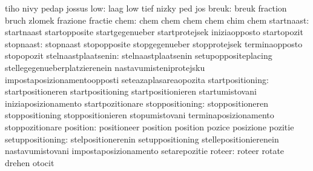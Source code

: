                                   tiho                             nivy
                                  pedap                            jossus
                             low: laag                             low
                                  tief                             nizky
                                  ped                              jos
                           breuk: breuk                            fraction
                                  bruch                            zlomek
                                  frazione                         fractie
                            chem: chem                             chem
                                  chem                             chem
                                  chim                             chem
                      startnaast: startnaast                       startopposite
                                  startgegenueber                  startprotejsek
                                  iniziaopposto                    startopozit
                       stopnaast: stopnaast                        stopopposite
                                  stopgegenueber                   stopprotejsek
                                  terminaopposto                   stopopozit
             stelnaastplaatsenin: stelnaastplaatsenin              setupoppositeplacing
                                  stellegegenueberplatzierenein    nastavumisteniprotejsku
                                  impostaposizionamentoopposti     seteazaplasareaopozita
                startpositioning: startpositioneren                startpositioning
                                  startpositionieren               startumistovani
                                  iniziaposizionamento             startpozitionare
                 stoppositioning: stoppositioneren                 stoppositioning
                                  stoppositionieren                stopumistovani
                                  terminaposizionamento            stoppozitionare
                        position: positioneer                      position
                                  position                         pozice
                                  posizione                        pozitie
                setuppositioning: stelpositionerenin               setuppositioning
                                  stellepositionierenein           nastavumistovani
                                  impostaposizionamento            setarepozitie
                          roteer: roteer                           rotate
                                  drehen                           otocit
